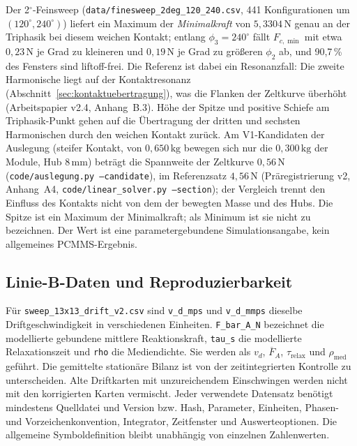 \documentclass[11pt,a4paper]{article}
\begin{document}
Der 2$^\circ$-Feinsweep (\texttt{data/finesweep\_2deg\_120\_240.csv}, 441 Konfigurationen um $(120^\circ,240^\circ)$) liefert ein Maximum der \emph{Minimalkraft} von $5{,}3304\,\mathrm N$ genau an der Triphasik bei diesem weichen Kontakt; entlang $\phi_3=240^\circ$ fällt $F_{c,\min}$ mit etwa $0{,}23\,\mathrm N$ je Grad zu kleineren und $0{,}19\,\mathrm N$ je Grad zu größeren $\phi_2$ ab, und 90{,}7\,\% des Fensters sind liftoff-frei. Die Referenz ist dabei ein Resonanzfall: Die zweite Harmonische liegt auf der Kontaktresonanz (Abschnitt~\ref{sec:kontaktuebertragung}), was die Flanken der Zeltkurve überhöht (Arbeitspapier v2.4, Anhang~B.3). Höhe der Spitze und positive Schiefe am Triphasik-Punkt gehen auf die Übertragung der dritten und sechsten Harmonischen durch den weichen Kontakt zurück. Am V1-Kandidaten der Auslegung (steifer Kontakt, von $0{,}650\,\mathrm{kg}$ bewegen sich nur die $0{,}300\,\mathrm{kg}$ der Module, Hub $8\,\mathrm{mm}$) beträgt die Spannweite der Zeltkurve $0{,}56\,\mathrm N$ (\texttt{code/auslegung.py --candidate}), im Referenzsatz $4{,}56\,\mathrm N$ (Präregistrierung v2, Anhang~A4, \texttt{code/linear\_solver.py --section}); der Vergleich trennt den Einfluss des Kontakts nicht von dem der bewegten Masse und des Hubs. Die Spitze ist ein Maximum der Minimalkraft; als Minimum ist sie nicht zu bezeichnen. Der Wert ist eine parametergebundene Simulationsangabe, kein allgemeines PCMMS-Ergebnis.

\subsection{Linie-B-Daten und Reproduzierbarkeit}\label{app:linieb}
Für \texttt{sweep\_13x13\_drift\_v2.csv} sind \texttt{v\_d\_mps} und \texttt{v\_d\_mmps} dieselbe Driftgeschwindigkeit in verschiedenen Einheiten. \texttt{F\_bar\_A\_N} bezeichnet die modellierte gebundene mittlere Reaktionskraft, \texttt{tau\_s} die modellierte Relaxationszeit und \texttt{rho} die Mediendichte. Sie werden als $v_d$, $\overline F_A$, $\tau_{\mathrm{relax}}$ und $\rho_{\mathrm{med}}$ geführt. Die gemittelte stationäre Bilanz ist von der zeitintegrierten Kontrolle zu unterscheiden. Alte Driftkarten mit unzureichendem Einschwingen werden nicht mit den korrigierten Karten vermischt.
Jeder verwendete Datensatz benötigt mindestens Quelldatei und Version bzw. Hash, Parameter, Einheiten, Phasen- und Vorzeichenkonvention, Integrator, Zeitfenster und Auswerteoptionen. Die allgemeine Symboldefinition bleibt unabhängig von einzelnen Zahlenwerten.
\end{document}
